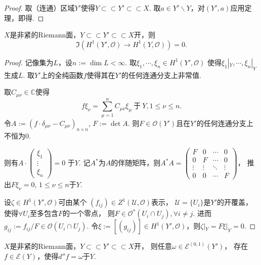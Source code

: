 \begin{proof}
	取（连通）区域$Y'$使得$Y\subset \subset Y'\subset \subset X$. 
    取$a\in Y'\backslash Y$，对$(Y',a)$应用定理，即得.
\end{proof}

\begin{theorem}
	$X$是非紧的Riemann面，$Y\subset \subset Y' \subset \subset X$开，则
	$$\Im ( H^1(Y',\mathcal{O})\rightarrow H^1(Y,\mathcal{O}))=0.$$
\end{theorem}
		
\begin{proof}
	记像集为$L$，设$n:=\dim L<\infty$. 取$\xi_1,\cdots,\xi_n\in H^1(Y',\mathcal{O})$
    使得$\xi_1|_Y,\cdots, \xi_n|_Y$生成$L$. 
    取$Y'$上的全纯函数$f$使得其在$Y'$的任何连通分支上非常值.

	取$C_{\mu \nu}\in \mathbb{C}$使得
	$$f\xi_\nu=\sum_{\mu=1}^n C_{\mu\nu}\xi_\mu \ \text{于} \ Y, 1\leq \nu \leq n.$$
	令$A:=(f\cdot \delta_{\mu\nu}-C_{\mu\nu})_{n\times n}$, $F:=\det A$. 
    则$F\in \mathcal{O}(Y')$且在$Y'$的任何连通分支上不恒为$0$.

	则有$A\cdot \begin{pmatrix} \xi_1\\ \vdots \\ \xi_n \end{pmatrix} =0$ 于$Y$. 
    记$A^*$为$A$的伴随矩阵，则$A^*A
    =\begin{pmatrix} F &0 &\cdots &0\\
        0 &F &\cdots &0 \\
        \vdots  &\vdots &\ddots &\vdots \\
        0 &0 &\cdots &F \end{pmatrix}$，
    推出$F\xi_\nu=0$, $1\leq \nu \leq n$于$Y$.

	设$\zeta \in H^1(Y', \mathcal{O})$可由某个
    $(f_{ij})\in Z^1(\mathscr{U},\mathcal{O})$表示，
    $\mathscr{U}=\{U_i\}$是$Y'$的开覆盖，使得$\forall U_i$至多包含$F$的一个零点，
    则$F\in \mathcal{O}^*(U_i\cap U_j), \forall i\neq j$. 
    进而$g_{ij}:=f_{ij}/F\in \mathcal{O}(U_i\cap U_j)$. 
    令$\xi:=[(g_{ij})]\in H^1(Y',\mathcal{O})$，则$\zeta|_Y=F\xi|_Y=0$.		
\end{proof}

\begin{corollary}
    $X$是非紧的Riemann面，$Y\subset \subset Y' \subset \subset X$开，
    则任意$\omega \in \mathcal{E}^{(0,1)}(Y')$，
    存在$f\in \mathcal{E}(Y)$，使得$d''f=\omega$于$Y$.
\end{corollary}

